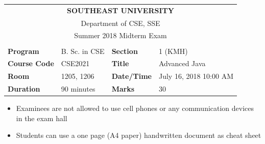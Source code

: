 \documentclass[addpoints,12pt]{exam}
\begin{document}
\pointsinrightmargin
\bracketedpoints
\pagestyle{headandfoot}
\runningheadrule
\firstpageheader{}{}{}

\begin{center}
\begin{tabular}{|ll|ll|}
\multicolumn{4}{c}{\Large{\textbf{\setmainfont{Agency FB}SOUTHEAST UNIVERSITY}}}\\
\multicolumn{4}{c}{Department of CSE, SSE}\\
\multicolumn{4}{c}{Summer 2018 Midterm Exam}\\
\multicolumn{4}{c}{}\\
\hline
\textbf{Program}		&	B. Sc. in CSE		&	\textbf{Section}	&	1 (KMH)\\
\textbf{Course Code}	&	CSE2021				&	\textbf{Title}		&	Advanced Java\\
\textbf{Room}			&	1205, 1206			&	\textbf{Date/Time}	&	July 16, 2018 10:00 AM\\
\textbf{Duration}		&	90 minutes			&	\textbf{Marks}		&	30\\
\hline
\end{tabular}
\end{center}

\begin{itemize}
\item Examinees are not allowed to use cell phones or any communication devices in the exam hall
\item Students can use a one page (A4 paper) handwritten document as cheat sheet
\end{itemize}
\end{document}
